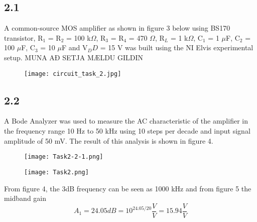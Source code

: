 \subsection*{2.1}
A common-source MOS amplifier as shown in figure 3 below using BS170 transistor, R$_1$ = R$_2$ = 100 k$\Omega$, R$_3$ = R$_4$ = 470 $\Omega$, R$_L$ = 1 k$\Omega$, C$_1$ = 1 $\mu$F, C$_2$ = 100 $\mu$F, C$_3$ = 10 $\mu$F and V$_DD$ = 15 V was built using the NI Elvis experimental setup. MUNA AÐ SETJA MÆLDU GILDIN

    \begin{figure}[h!]
        \centering
        \texttt{[image: circuit\_task\_2.jpg]}
    \end{figure}


\pagebreak
\subsection*{2.2}


A Bode Analyzer was used to measure the AC characteristic of the amplifier in the frequency range 10 Hz to 50 kHz using 10 steps per decade and input signal amplitude of 50 mV. The result of this analysis is shown in figure 4.

    \begin{figure}[h!]
        \centering
        \texttt{[image: Task2-2-1.png]}
    \end{figure}

    \begin{figure}[h!]
        \centering
        \texttt{[image: Task2.png]}
    \end{figure}

From figure 4, the 3dB frequency can be seen as 1000 kHz and from figure 5 the midband gain $$A_1 = 24.05 dB = 10^{24.05/20} \frac{V}{V} = 15.94 \frac{V}{V}$$


